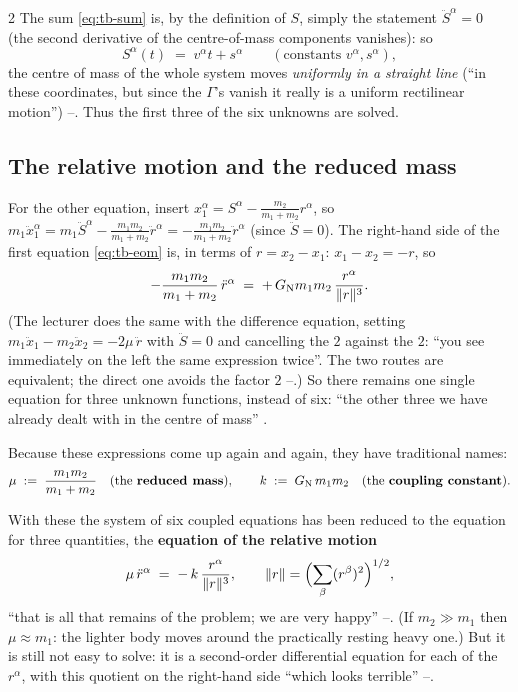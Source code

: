 \begin{paracol}{2}
The sum \eqref{eq:tb-sum} is, by the definition of $S$, simply the statement $\ddot S^\alpha=0$ (the second derivative of the centre-of-mass components vanishes): so
\begin{equation}\label{eq:tb-cmmotion}
  S^\alpha(t)\;=\;v^\alpha t+s^\alpha\qquad(\text{constants }v^\alpha,s^\alpha),
\end{equation}
the centre of mass of the whole system moves \emph{uniformly in a straight line} (``in these coordinates, but since the $\Gamma$'s vanish it really is a uniform rectilinear motion'') --. Thus the first three of the six unknowns are solved.

\subsection{The relative motion and the reduced mass}\label{ssec:tb-reduced}

For the other equation, insert $x_1^\alpha=S^\alpha-\frac{m_2}{m_1+m_2}r^\alpha$, so $m_1\ddot x_1^\alpha=m_1\ddot S^\alpha-\frac{m_1m_2}{m_1+m_2}\ddot r^\alpha=-\frac{m_1m_2}{m_1+m_2}\ddot r^\alpha$ (since $\ddot S=0$). The right-hand side of the first equation \eqref{eq:tb-eom} is, in terms of $r=x_2-x_1$: $x_1-x_2=-r$, so
\[
  -\frac{m_1m_2}{m_1+m_2}\,\ddot r^\alpha\;=\;+\,G_{\rm N}m_1m_2\,\frac{r^\alpha}{\|r\|^3}.
\]
(The lecturer does the same with the difference equation, setting $m_1\ddot x_1-m_2\ddot x_2=-2\mu\,\ddot r$ with $\ddot S=0$ and cancelling the $2$ against the $2$: ``you see immediately on the left the same expression twice''. The two routes are equivalent; the direct one avoids the factor $2$ --.)
So there remains one single equation for three unknown functions, instead of six: ``the other three we have already dealt with in the centre of mass'' .

\begin{definition}\label{def:tb-reduced}
Because these expressions come up again and again, they have traditional names:
\begin{equation}\label{eq:tb-mu}
  \mu\;:=\;\frac{m_1m_2}{m_1+m_2}\quad\text{(the \textbf{reduced mass})},\qquad k\;:=\;G_{\rm N}\,m_1m_2\quad\text{(the \textbf{coupling constant})}.
\end{equation}
\end{definition}
With these the system of six coupled equations has been reduced to the equation for three quantities, the \textbf{equation of the relative motion}
\begin{equation}\label{eq:tb-rel}
  \mu\,\ddot r^\alpha\;=\;-\,k\,\frac{r^\alpha}{\|r\|^3},\qquad \|r\|=\Bigl(\sum_\beta(r^\beta)^2\Bigr)^{1/2},
\end{equation}
``that is all that remains of the problem; we are very happy'' --. (If $m_2\gg m_1$ then $\mu\approx m_1$: the lighter body moves around the practically resting heavy one.) But it is still not easy to solve: it is a second-order differential equation for each of the $r^\alpha$, with this quotient on the right-hand side ``which looks terrible'' --.


\end{paracol}
